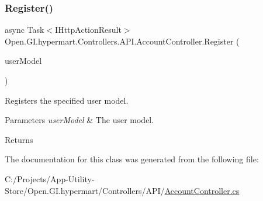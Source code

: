 \subsubsection{\texorpdfstring{Register()}{Register()}}
{\footnotesize\ttfamily async Task$<$I\+Http\+Action\+Result$>$ Open.\+G\+I.\+hypermart.\+Controllers.\+A\+P\+I.\+Account\+Controller.\+Register (\begin{DoxyParamCaption}\item[{\hyperlink{class_open_1_1_g_i_1_1hypermart_1_1_models_1_1_user_model}{User\+Model}}]{user\+Model }\end{DoxyParamCaption})}



Registers the specified user model. 


\begin{DoxyParams}{Parameters}
{\em user\+Model} & The user model.\\
\hline
\end{DoxyParams}
\begin{DoxyReturn}{Returns}

\end{DoxyReturn}


The documentation for this class was generated from the following file\+:\begin{DoxyCompactItemize}
\item 
C\+:/\+Projects/\+App-\/\+Utility-\/\+Store/\+Open.\+G\+I.\+hypermart/\+Controllers/\+A\+P\+I/\hyperlink{_account_controller_8cs}{Account\+Controller.\+cs}\end{DoxyCompactItemize}
